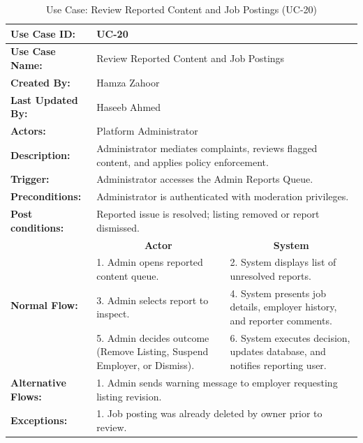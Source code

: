 \begin{table}[H]
\centering
\small
\caption{Use Case: Review Reported Content and Job Postings (UC-20)}
\label{tab:uc20_spec}
\begin{tabular}{|p{3.2cm}|p{5.5cm}|p{5.5cm}|}
\hline
\textbf{Use Case ID:} & \multicolumn{2}{p{11.4cm}|}{UC-20} \\ \hline
\textbf{Use Case Name:} & \multicolumn{2}{p{11.4cm}|}{Review Reported Content and Job Postings} \\ \hline
\textbf{Created By:} & \multicolumn{2}{p{11.4cm}|}{Hamza Zahoor} \\ \hline
\textbf{Last Updated By:} & \multicolumn{2}{p{11.4cm}|}{Haseeb Ahmed} \\ \hline
\textbf{Actors:} & \multicolumn{2}{p{11.4cm}|}{Platform Administrator} \\ \hline
\textbf{Description:} & \multicolumn{2}{p{11.4cm}|}{Administrator mediates complaints, reviews flagged content, and applies policy enforcement.} \\ \hline
\textbf{Trigger:} & \multicolumn{2}{p{11.4cm}|}{Administrator accesses the Admin Reports Queue.} \\ \hline
\textbf{Preconditions:} & \multicolumn{2}{p{11.4cm}|}{Administrator is authenticated with moderation privileges.} \\ \hline
\textbf{Post conditions:} & \multicolumn{2}{p{11.4cm}|}{Reported issue is resolved; listing removed or report dismissed.} \\ \hline
\multirow{4}{*}{\textbf{Normal Flow:}} & \multicolumn{1}{c|}{\textbf{Actor}} & \multicolumn{1}{c|}{\textbf{System}} \\ \cline{2-3}
& 1. Admin opens reported content queue. & 2. System displays list of unresolved reports. \vspace{2pt} \\
& 3. Admin selects report to inspect. & 4. System presents job details, employer history, and reporter comments. \vspace{2pt} \\
& 5. Admin decides outcome (Remove Listing, Suspend Employer, or Dismiss). & 6. System executes decision, updates database, and notifies reporting user. \\ \hline
\textbf{Alternative Flows:} & \multicolumn{2}{p{11.4cm}|}{1. Admin sends warning message to employer requesting listing revision.} \\ \hline
\textbf{Exceptions:} & \multicolumn{2}{p{11.4cm}|}{1. Job posting was already deleted by owner prior to review.} \\ \hline
\end{tabular}
\end{table}

